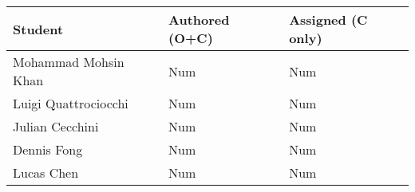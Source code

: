 \documentclass{article}
\begin{document}

\begin{table}[H]
\centering
\begin{tabular}{lll}
\toprule
\textbf{Student} & \textbf{Authored (O+C)} & \textbf{Assigned (C only)}\\
\midrule
Mohammad Mohsin Khan & Num & Num \\
Luigi Quattrociocchi & Num & Num \\
Julian Cecchini & Num & Num \\
Dennis Fong & Num & Num \\
Lucas Chen & Num & Num \\
\bottomrule
\end{tabular}
\end{table}


\end{document}
